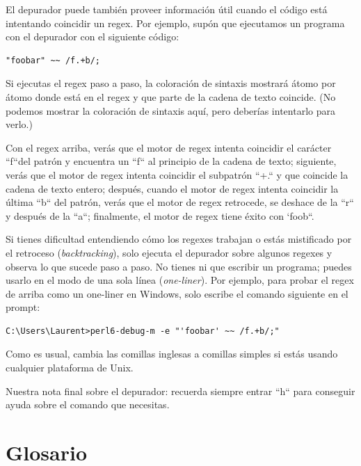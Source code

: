 El depurador puede también proveer información útil cuando
el código está intentando coincidir un regex. Por ejemplo, 
supón que ejecutamos un programa con el depurador con el
siguiente código:

\begin{verbatim}
"foobar" ~~ /f.+b/;
\end{verbatim}

Si ejecutas el regex paso a paso, la coloración de sintaxis mostrará
átomo por átomo donde está en el regex y que parte de la 
cadena de texto coincide. (No podemos mostrar la coloración de sintaxis
aquí, pero deberías intentarlo para verlo.)

Con el regex arriba, verás que el motor de regex 
intenta coincidir el carácter ``f``del patrón
y encuentra un ``f`` al principio de la cadena de texto;
siguiente, verás que el motor de regex intenta coincidir 
el subpatrón ``+.`` y que coincide la cadena de texto entero;
después, cuando el motor de regex intenta coincidir la 
última ``b`` del patrón, verás que el motor de regex retrocede,
se deshace de la ``r`` y después de la ``a``; finalmente,
el motor de regex tiene éxito con `foob``.

Si tienes dificultad entendiendo cómo los regexes trabajan
o estás mistificado por el retroceso (\emph{backtracking}),
solo ejecuta el depurador sobre algunos regexes y observa
lo que sucede paso a paso. No tienes ni que escribir un 
programa; puedes usarlo en el modo de una sola línea (\emph{one-liner}).
Por ejemplo, para probar el regex de arriba como un one-liner 
en Windows, solo escribe el comando siguiente en el prompt:

\begin{verbatim}
C:\Users\Laurent>perl6-debug-m -e "'foobar' ~~ /f.+b/;"
\end{verbatim}

Como es usual, cambia las comillas inglesas a comillas simples 
si estás usando cualquier plataforma de Unix.
 
Nuestra nota final sobre el depurador: recuerda siempre entrar
``h`` para conseguir ayuda sobre el comando que necesitas.


\section{Glosario}

